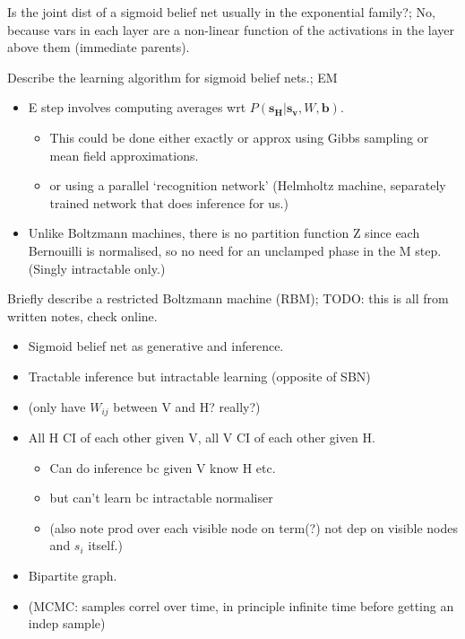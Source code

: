 \documentclass{article}
\begin{document}
Is the joint dist of a sigmoid belief net usually in the exponential family?; No, because vars in each layer are a non-linear function of the activations in the layer above them (immediate parents).

Describe the learning algorithm for sigmoid belief nets.; EM \begin{itemize} \item E step involves computing averages wrt $P(\mathbf{s_H | s_v}, W, \mathbf{b})$.  \begin{itemize} \item This could be done either exactly or approx using Gibbs sampling or mean field approximations. \item or using a parallel `recognition network' (Helmholtz machine, separately trained network that does inference for us.) \end{itemize} \item Unlike Boltzmann machines, there is no partition function Z since each Bernouilli is normalised, so no need for an unclamped phase in the M step. (Singly intractable only.) \end{itemize}

Briefly describe a restricted Boltzmann machine (RBM); TODO: this is all from written notes, check online. \begin{itemize} \item Sigmoid belief net as generative and inference. \item Tractable inference but intractable learning (opposite of SBN) \item (only have $W_{ij}$ between V and H? really?) \item All H CI of each other given V, all V CI of each other given H. \begin{itemize} \item Can do inference bc given V know H etc. \item but can't learn bc intractable normaliser \item (also note prod over each visible node on term(?) not dep on visible nodes and $s_i$ itself.) \end{itemize} \item Bipartite graph. \item (MCMC: samples correl over time, in principle infinite time before getting an indep sample) \end{itemize}
\end{document}
